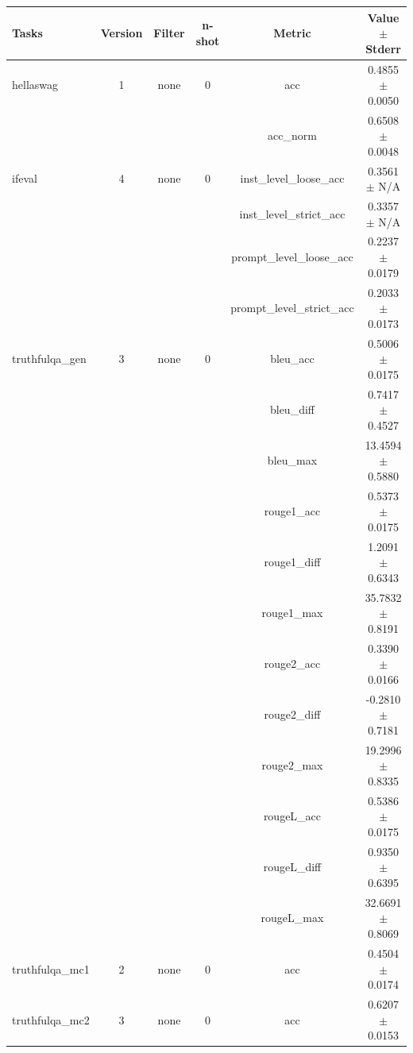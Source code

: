 \documentclass{ifacconf}
\begin{document}
\begin{strip}
\begin{minipage}{\textwidth}
    \begin{table}[H]
    \centering
    \begin{tabular}{|l|c|c|c|c|c|}
    \hline
    \textbf{Tasks} & \textbf{Version} & \textbf{Filter} & \textbf{n-shot} & \textbf{Metric} & \textbf{Value} $\pm$ \textbf{Stderr} \\ \hline
    hellaswag & 1 & none & 0 & acc & 0.4855 $\pm$ 0.0050 \\ \hline
    & & & & acc\_norm & 0.6508 $\pm$ 0.0048 \\ \hline
    ifeval & 4 & none & 0 & inst\_level\_loose\_acc & 0.3561 $\pm$ N/A \\ \hline
    & & & & inst\_level\_strict\_acc & 0.3357 $\pm$ N/A \\ \hline
    & & & & prompt\_level\_loose\_acc & 0.2237 $\pm$ 0.0179 \\ \hline
    & & & & prompt\_level\_strict\_acc & 0.2033 $\pm$ 0.0173 \\ \hline
    truthfulqa\_gen & 3 & none & 0 & bleu\_acc & 0.5006 $\pm$ 0.0175 \\ \hline
    & & & & bleu\_diff & 0.7417 $\pm$ 0.4527 \\ \hline
    & & & & bleu\_max & 13.4594 $\pm$ 0.5880 \\ \hline
    & & & & rouge1\_acc & 0.5373 $\pm$ 0.0175 \\ \hline
    & & & & rouge1\_diff & 1.2091 $\pm$ 0.6343 \\ \hline
    & & & & rouge1\_max & 35.7832 $\pm$ 0.8191 \\ \hline
    & & & & rouge2\_acc & 0.3390 $\pm$ 0.0166 \\ \hline
    & & & & rouge2\_diff & -0.2810 $\pm$ 0.7181 \\ \hline
    & & & & rouge2\_max & 19.2996 $\pm$ 0.8335 \\ \hline
    & & & & rougeL\_acc & 0.5386 $\pm$ 0.0175 \\ \hline
    & & & & rougeL\_diff & 0.9350 $\pm$ 0.6395 \\ \hline
    & & & & rougeL\_max & 32.6691 $\pm$ 0.8069 \\ \hline
    truthfulqa\_mc1 & 2 & none & 0 & acc & 0.4504 $\pm$ 0.0174 \\ \hline
    truthfulqa\_mc2 & 3 & none & 0 & acc & 0.6207 $\pm$ 0.0153 \\ \hline
    \end{tabular}
    \label{tab:gemma2_q5km}
    \end{table}
\end{minipage}
\end{strip}
\vfill
\clearpage
\pagebreak
\end{document}
